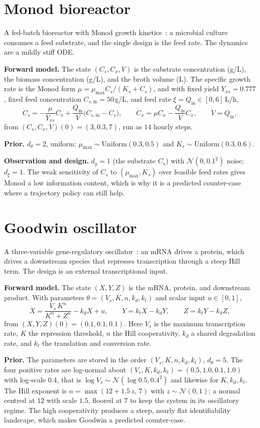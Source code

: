 \section{Monod bioreactor}
A fed-batch bioreactor with Monod growth kinetics~\citep{monod1949growth,strouwen2026deep}:
a microbial culture consumes a feed substrate, and the single design is the feed rate. The
dynamics are a mildly stiff ODE.

\textbf{Forward model.} The state $(C_s,C_x,V)$ is the substrate concentration (g/L), the
biomass concentration (g/L), and the broth volume (L). The specific growth rate is the
Monod form $\mu=\mu_{\max}C_s/(K_s+C_s)$, and with fixed yield $Y_{xs}=0.777$, fixed feed
concentration $C_{s,\mathrm{in}}=50$\,g/L, and feed rate $\xi=Q_{\mathrm{in}}\in[0,6]$\,L/h,
\[
\dot C_s=-\frac{\mu}{Y_{xs}}C_x+\frac{Q_{\mathrm{in}}}{V}\big(C_{s,\mathrm{in}}-C_s\big),
\qquad
\dot C_x=\mu C_x-\frac{Q_{\mathrm{in}}}{V}C_x,
\qquad
\dot V=Q_{\mathrm{in}},
\]
from $(C_s,C_x,V)(0)=(3,0.3,7)$, run as $14$ hourly steps.

\textbf{Prior.} $d_\theta=2$, uniform: $\mu_{\max}\sim\mathrm{Uniform}(0.3,0.5)$ and
$K_s\sim\mathrm{Uniform}(0.3,0.6)$.

\textbf{Observation and design.} $d_y=1$ (the substrate $C_s$) with $\mathcal N(0,0.1^2)$
noise; $d_\xi=1$. The weak sensitivity of $C_s$ to $(\mu_{\max},K_s)$ over feasible feed
rates gives Monod a low information content, which is why it is a predicted counter-case
where a trajectory policy can still help.

\section{Goodwin oscillator}
A three-variable gene-regulatory oscillator~\citep{strouwen2026deep}: an mRNA drives a
protein, which drives a downstream species that represses transcription through a steep
Hill term. The design is an external transcriptional input.

\textbf{Forward model.} The state $(X,Y,Z)$ is the mRNA, protein, and downstream product.
With parameters $\theta=(V_s,K,n,k_d,k_t)$ and scalar input $u\in[0,1]$,
\[
\dot X=\frac{V_s\,K^n}{K^n+Z^n}-k_d X+u,
\qquad
\dot Y=k_t X-k_d Y,
\qquad
\dot Z=k_t Y-k_d Z,
\]
from $(X,Y,Z)(0)=(0.1,0.1,0.1)$. Here $V_s$ is the maximum transcription rate, $K$ the
repression threshold, $n$ the Hill cooperativity, $k_d$ a shared degradation rate, and
$k_t$ the translation and conversion rate.

\textbf{Prior.} The parameters are stored in the order $(V_s,K,n,k_d,k_t)$, $d_\theta=5$.
The four positive rates are log-normal about $(V_s,K,k_d,k_t)=(0.5,1.0,0.1,1.0)$ with
log-scale $0.4$, that is $\log V_s\sim\mathcal N(\log 0.5,0.4^2)$ and likewise for
$K,k_d,k_t$. The Hill exponent is $n=\max(12+1.5\,z,\,7)$ with $z\sim\mathcal N(0,1)$: a
normal centred at $12$ with scale $1.5$, floored at $7$ to keep the system in its
oscillatory regime. The high cooperativity produces a steep, nearly flat identifiability
landscape, which makes Goodwin a predicted counter-case.


